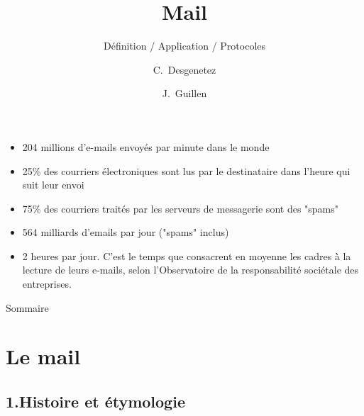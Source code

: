 \documentclass{beamer}
\title{Mail}
\subtitle{Définition / Application / Protocoles}
\author{C.~Desgenetez \and J.~Guillen}
\institute[Faculté des sciences de Montpellier] %
\begin{document}
\begin{frame}
  \titlepage
\end{frame}
\begin{frame}
    \begin{itemize}
        \item{
            204 millions d’e-mails envoyés par minute dans le monde
        }
        \item{
            25\% des courriers électroniques sont lus par le destinataire dans l’heure qui suit leur envoi
        }
        \item{
             75\% des courriers traités par les serveurs de messagerie sont des "spams" 
        }
        \item{
             564 milliards d’emails par jour ("spams" inclus)
        }
        \item{
              2 heures par jour. C’est le temps que consacrent en moyenne les cadres \`à la lecture de leurs e-mails, selon l’Observatoire de la responsabilité sociétale des entreprises.
        }
    \end{itemize}
\end{frame}
\begin{frame}{Sommaire}
  \tableofcontents
\end{frame}

\section{Le mail}

    \subsection{1.Histoire et étymologie}
    
\end{document}
